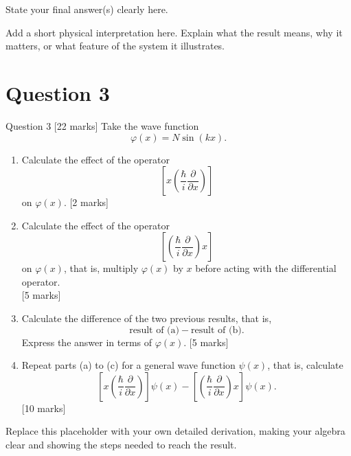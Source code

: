 \documentclass[12pt]{article}
\newif\ifsolutions
\begin{document}
\begin{answerbox}
State your final answer(s) clearly here.
\end{answerbox}

\begin{insightbox}
Add a short physical interpretation here. Explain what the result means, why it matters, or what feature of the system it illustrates.
\end{insightbox}
\fi

\newpage
\section{Question 3}
\begin{problembox}{Question 3 \hfill [22 marks]}
Take the wave function
\[
    \varphi(x) = N \sin(kx).
\]
\begin{enumerate}
    \item Calculate the effect of the operator
    \[
        \left[x\left(\frac{\hbar}{i}\frac{\partial}{\partial x}\right)\right]
    \]
    on \(\varphi(x)\). \hfill [2 marks]

    \item Calculate the effect of the operator
    \[
        \left[\left(\frac{\hbar}{i}\frac{\partial}{\partial x}\right)x\right]
    \]
    on \(\varphi(x)\), that is, multiply \(\varphi(x)\) by \(x\) before acting with the differential operator.
    \\
    \phantom{add some invisible space} \hfill [5 marks]

    \item Calculate the difference of the two previous results, that is,
    \[
        \text{result of (a)} - \text{result of (b)}.
    \]
    Express the answer in terms of \(\varphi(x)\). \hfill [5 marks]

    \item Repeat parts (a) to (c) for a general wave function \(\psi(x)\), that is, calculate
    \[
        \left[x\left(\frac{\hbar}{i}\frac{\partial}{\partial x}\right)\right] \psi(x)
        -
        \left[\left(\frac{\hbar}{i}\frac{\partial}{\partial x}\right)x\right] \psi(x).
    \]
    \hfill [10 marks]
\end{enumerate}
\end{problembox}

\ifsolutions
\begin{solutionbox}
 Replace this placeholder with your own detailed derivation, making your algebra clear and showing the steps needed to reach the result.
\end{solutionbox}
\end{document}
